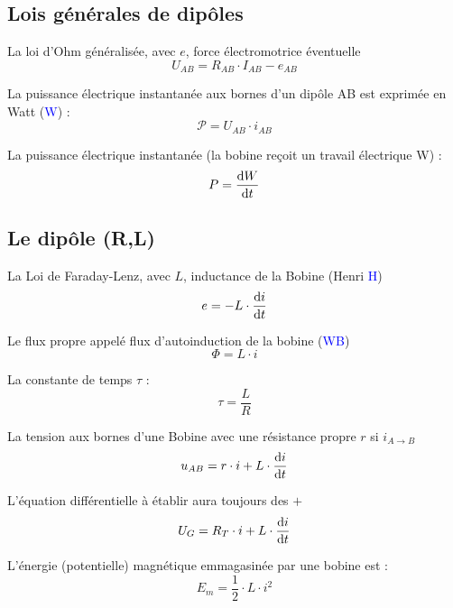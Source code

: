 \documentclass[main.tex]{subfiles}
\begin{document}
\subsection{Lois générales de dipôles}
\begin{Definition}
    La loi d'Ohm généralisée, avec $e$, force électromotrice éventuelle
    $$U_{AB} = R_{AB} \cdot I_{AB} - e_{AB}$$

    La puissance électrique instantanée aux bornes d'un dipôle AB est exprimée en Watt (\textcolor{blue}{W}) :
    $$\mathcal{P} = U_{AB} \cdot i_{AB} $$

    La puissance électrique instantanée (la bobine reçoit un travail électrique W) :
    $$P = \dfrac{\text{d} W}{\text{d} t}$$
\end{Definition}

\subsection{Le dipôle (R,L)}
\begin{Definition}
    La Loi de Faraday-Lenz, avec $L$, inductance de la Bobine (Henri \textcolor{blue}{H})
    $$e = - L \cdot \dfrac{\text{d} i}{\text{d} t}$$

    Le flux propre appelé flux d'autoinduction de la bobine (\textcolor{blue}{WB})
    $$\Phi = L \cdot i$$

    La constante de temps $\tau$ : 
    $$\tau = \dfrac{L}{R} $$

    La tension aux bornes d'une Bobine avec une résistance propre $r$ si $i_{A\rightarrow B}$
    $$u_{AB} = r \cdot i + L \cdot \dfrac{\text{d} i}{\text{d} t}$$

    L'équation différentielle à établir aura toujours des $+$
    $$U_{G} = R_{T} \cdot i + L \cdot \dfrac{\text{d} i}{\text{d} t}$$

    L'énergie (potentielle) magnétique emmagasinée par une bobine est :
    $$E_{m} = \dfrac{1}{2} \cdot L \cdot i^2$$
\end{Definition}
\end{document}
